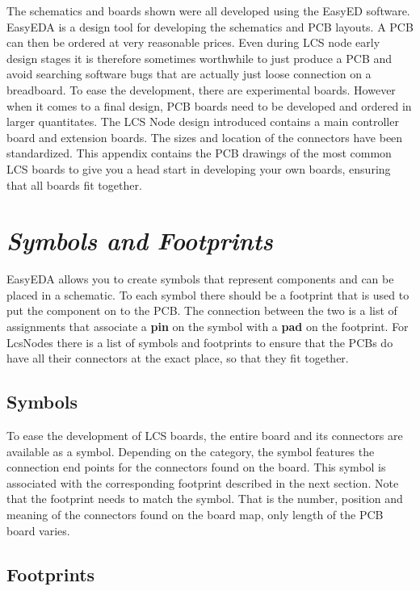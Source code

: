 
The schematics and boards shown were all developed using the EasyED software. EasyEDA is a design tool for developing the schematics and PCB layouts. A PCB can then be ordered at very reasonable prices. Even during LCS node early design stages it is therefore sometimes worthwhile to just produce a PCB and avoid searching software bugs that are actually just loose connection on a breadboard. To ease the development, there are experimental boards. However when it comes to a final design, PCB boards need to be developed and ordered in larger quantitates. The LCS Node design introduced contains a main controller board and extension boards. The sizes and location of the connectors have been standardized. This appendix contains the PCB drawings of the most common LCS boards to give you a head start in developing your own boards, ensuring that all boards fit together.

\section{\textit{Symbols and Footprints}}

EasyEDA allows you to create symbols that represent components and can be placed in a schematic. To each symbol there should be a footprint that is used to put the component on to the PCB. The connection between the two is a list of assignments that associate a \textbf{pin} on the symbol with a \textbf{pad} on the footprint. For LcsNodes there is a list of symbols and footprints to ensure that the PCBs do have all their connectors at the exact place, so that they fit together.

\subsection{Symbols}

To ease the development of LCS boards, the entire board and its connectors are available as a symbol. Depending on the category, the symbol features the connection end points for the connectors found on the board. This symbol is associated with the corresponding footprint described in the next section. Note that the footprint needs to match the symbol. That is the number, position and meaning of the connectors found on the board map, only length of the PCB board varies.


\subsection{Footprints}

